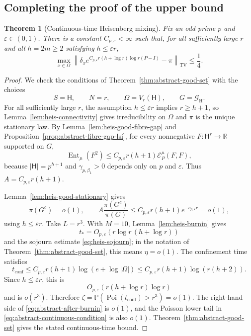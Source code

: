 \documentclass[11pt, reqno]{amsart}
\numberwithin{equation}{section}
\newtheorem{theorem}{Theorem}[section]
\newcommand{\Heis}{\mathsf H}
\newcommand{\Ent}{\operatorname{Ent}}
\newcommand{\TV}{\mathrm{TV}}
\newcommand{\Prob}{\mathbb P}
\newcommand{\cE}{\mathcal E}
\newcommand{\Good}{\mathcal G}
\begin{document}
\subsection{Completing the proof of the upper bound}\label{subsec:heis-apply}

\begin{theorem}[Continuous-time Heisenberg mixing]\label{thm:heis-continuous-time}
Fix an odd prime \(p\) and \(\varepsilon\in(0,1)\).  There is a constant
\(C_{p,\varepsilon}<\infty\) such that, for all sufficiently large \(r\) and all
\(h=2m\ge2\) satisfying \(h\le\varepsilon r\),
\[
    \max_{x\in\Omega}
    \left\|\delta_x e^{C_{p,\varepsilon}r(h+\log r)\log r(P-I)}-\pi\right\|_{\TV}
    \le\frac14.
\]
\end{theorem}

\begin{proof}
We check the conditions of Theorem~\ref{thm:abstract-good-set} with the choices
\[
    S=\Heis,
    \qquad N=r,
    \qquad \Omega=V_r(\Heis),
    \qquad G=\Good_{\mathrm H}.
\]
For all sufficiently large \(r\), the assumption \(h\le\varepsilon r\) implies
\(r\ge h+1\), so Lemma~\ref{lem:heis-connectivity} gives irreducibility on
\(\Omega\) and \(\pi\) is the unique stationary law.  By
Lemma~\ref{lem:heis-good-fibre-gap} and Proposition~\ref{prop:abstract-fibre-gap-lsi},
for every nonnegative \(F:\Heis^r\to\mathbb R\) supported on \(G\),
\[
    \Ent_\mu(F^2)
    \le C_{p,\varepsilon}r(h+1)\cE_P^\mu(F,F),
\]
because \(|\Heis|=p^{h+1}\) and \(\gamma_{p,\beta_1}>0\) depends only on
\(p\) and \(\varepsilon\).  Thus \(A=C_{p,\varepsilon}r(h+1)\).

Lemma~\ref{lem:heis-good-stationary} gives
\[
    \pi(G^c)=o(1),
    \qquad
    A\frac{\pi(G^c)}{\pi(G)}
    \le C_{p,\varepsilon}r(h+1)e^{-c_{p,\varepsilon}r}=o(1),
\]
using \(h\le\varepsilon r\).  Take \(L=r^3\).  With \(M=10\), Lemma~\ref{lem:heis-burnin} gives
\[
    t_*=O_{p,\varepsilon}(r\log r\,(h+\log r))
\]
and the sojourn estimate \eqref{eq:heis-sojourn}; in the notation of
Theorem~\ref{thm:abstract-good-set}, this means \(\eta=o(1)\).  The confinement
time satisfies
\[
    t_{\mathrm{conf}}
    \le C_{p,\varepsilon}r(h+1)\log(e+\log|\Omega|)
    \le C_{p,\varepsilon}r(h+1)\log(r(h+2)).
\]
Since \(h\le\varepsilon r\), this is
\[
    O_{p,\varepsilon}(r(h+\log r)\log r)
\]
and is \(o(r^3)\).  Therefore
\(\zeta=\Prob(\operatorname{Poi}(t_{\mathrm{conf}})>r^3)=o(1)\).  The right-hand
side of \eqref{eq:abstract-after-burnin} is \(o(1)\), and the Poisson lower tail
in \eqref{eq:abstract-continuous-condition} is also \(o(1)\).  Theorem~\ref{thm:abstract-good-set}
gives the stated continuous-time bound.
\end{proof}
\end{document}
